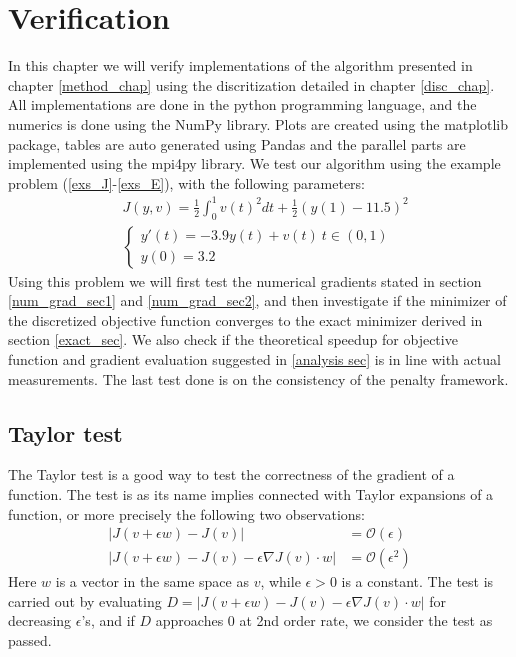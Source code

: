 \chapter{Verification}\label{Verification chapter}
In this chapter we will verify implementations of the algorithm presented in chapter \ref{method_chap} using the discritization detailed in chapter \ref{disc_chap}. All implementations are done in the python programming language, and the numerics is done using the NumPy\cite{walt2011numpy} library. Plots are created using the matplotlib\cite{Hunter:2007} package, tables are auto generated using Pandas\cite{mckinney2010data} and the parallel parts are implemented using the mpi4py\cite{dalcin2007mpi4py} library. We test our algorithm using the example problem (\ref{exs_J}-\ref{exs_E}), with the following parameters:
\begin{align}
&J(y,v) = \frac{1}{2}\int_0^1v(t)^2dt + \frac{1}{2}(y(1)-11.5)^2 \label{test_J}\\
&\left\{
     \begin{array}{lr}
       	y'(t) = -3.9y(t)+v(t) \ t\in(0,1)\\
       	y(0)=3.2
     \end{array}
   \right. \label{test_E}
\end{align}
Using this problem we will first test the numerical gradients stated in section \ref{num_grad_sec1} and \ref{num_grad_sec2}, and then investigate if the minimizer of the discretized objective function converges to the exact minimizer derived in section \ref{exact_sec}. We also check if the theoretical speedup for objective function and gradient evaluation suggested in \ref{analysis sec} is in line with actual measurements. The last test done is on the consistency of the penalty framework. 
\section{Taylor test} \label{Taylor_sec}
The Taylor test is a good way to test the correctness of the gradient of a function. The test is as its name implies connected with Taylor expansions of a function, or more precisely the following two observations:
\begin{align*}
|J(v+\epsilon w)-J(v)| &= \mathcal{O}(\epsilon) \\
|J(v+\epsilon w)-J(v)-\epsilon\nabla J(v)\cdot w| &= \mathcal{O}(\epsilon^2)
\end{align*}
Here $w$ is a vector in the same space as $v$, while $\epsilon>0$ is a constant. The test is carried out by evaluating $D=|J(v+\epsilon w)-J(v)-\epsilon\nabla J(v)\cdot w|$ for decreasing $\epsilon$'s, and if $D$ approaches 0 at 2nd order rate, we consider the test as passed.

